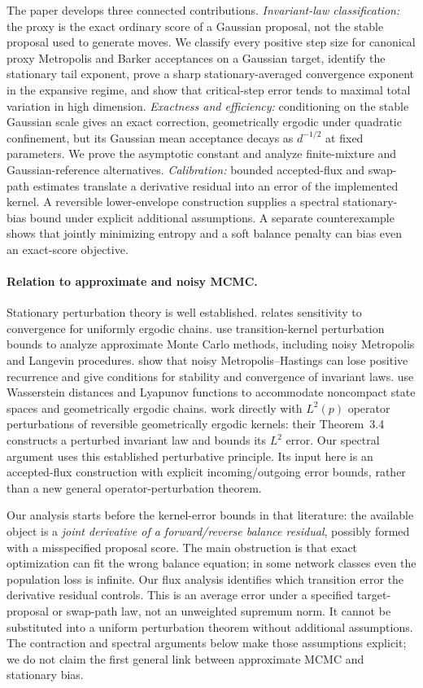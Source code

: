 \documentclass[pdflatex,iicol,sn-mathphys-ay]{sn-jnl}
\theoremstyle{definition}\newtheorem{definition}[theorem]{Definition}
\theoremstyle{remark}\newtheorem{remark}[theorem]{Remark}
\numberwithin{equation}{section}
\newcommand{\1}{\mathbf 1}
\begin{document}
The paper develops three connected contributions. \emph{Invariant-law classification:} the proxy is the exact ordinary score of a Gaussian proposal, not the stable proposal used to generate moves. We classify every positive step size for canonical proxy Metropolis and Barker acceptances on a Gaussian target, identify the stationary tail exponent, prove a sharp stationary-averaged convergence exponent in the expansive regime, and show that critical-step error tends to maximal total variation in high dimension. \emph{Exactness and efficiency:} conditioning on the stable Gaussian scale gives an exact correction, geometrically ergodic under quadratic confinement, but its Gaussian mean acceptance decays as $d^{-1/2}$ at fixed parameters. We prove the asymptotic constant and analyze finite-mixture and Gaussian-reference alternatives. \emph{Calibration:} bounded accepted-flux and swap-path estimates translate a derivative residual into an error of the implemented kernel. A reversible lower-envelope construction supplies a spectral stationary-bias bound under explicit additional assumptions. A separate counterexample shows that jointly minimizing entropy and a soft balance penalty can bias even an exact-score objective.

\paragraph{Relation to approximate and noisy MCMC.}
Stationary perturbation theory is well established. \citet{mitrophanov} relates sensitivity to convergence for uniformly ergodic chains. \citet{alquierNoisy} use transition-kernel perturbation bounds to analyze approximate Monte Carlo methods, including noisy Metropolis and Langevin procedures. \citet{medina} show that noisy Metropolis--Hastings can lose positive recurrence and give conditions for stability and convergence of invariant laws. \citet{rudolf} use Wasserstein distances and Lyapunov functions to accommodate noncompact state spaces and geometrically ergodic chains. \citet{negrea} work directly with $L^2(p)$ operator perturbations of reversible geometrically ergodic kernels: their Theorem~3.4 constructs a perturbed invariant law and bounds its $L^2$ error. Our spectral argument uses this established perturbative principle. Its input here is an accepted-flux construction with explicit incoming/outgoing error bounds, rather than a new general operator-perturbation theorem.

Our analysis starts before the kernel-error bounds in that literature: the available object is a \emph{joint derivative of a forward/reverse balance residual}, possibly formed with a misspecified proposal score. The main obstruction is that exact optimization can fit the wrong balance equation; in some network classes even the population loss is infinite. Our flux analysis identifies which transition error the derivative residual controls. This is an average error under a specified target-proposal or swap-path law, not an unweighted supremum norm. It cannot be substituted into a uniform perturbation theorem without additional assumptions. The contraction and spectral arguments below make those assumptions explicit; we do not claim the first general link between approximate MCMC and stationary bias.
\end{document}
